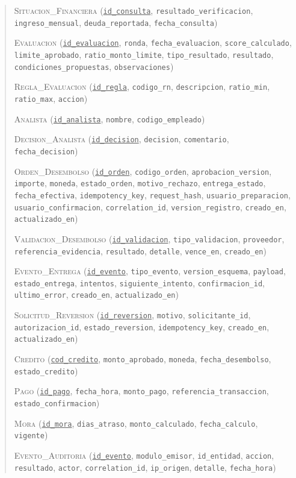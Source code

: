 \begin{quote}
\textsc{Situacion\_Financiera} (\underline{\texttt{id\_consulta}}, \texttt{resultado\_verificacion}, \texttt{ingreso\_mensual}, \texttt{deuda\_reportada}, \texttt{fecha\_consulta})

\textsc{Evaluacion} (\underline{\texttt{id\_evaluacion}}, \texttt{ronda}, \texttt{fecha\_evaluacion}, \texttt{score\_calculado}, \texttt{limite\_aprobado}, \texttt{ratio\_monto\_limite}, \texttt{tipo\_resultado}, \texttt{resultado}, \texttt{condiciones\_propuestas}, \texttt{observaciones})

\textsc{Regla\_Evaluacion} (\underline{\texttt{id\_regla}}, \texttt{codigo\_rn}, \texttt{descripcion}, \texttt{ratio\_min}, \texttt{ratio\_max}, \texttt{accion})

\textsc{Analista} (\underline{\texttt{id\_analista}}, \texttt{nombre}, \texttt{codigo\_empleado})

\textsc{Decision\_Analista} (\underline{\texttt{id\_decision}}, \texttt{decision}, \texttt{comentario}, \texttt{fecha\_decision})

\textsc{Orden\_Desembolso} (\underline{\texttt{id\_orden}}, \texttt{codigo\_orden}, \texttt{aprobacion\_version}, \texttt{importe}, \texttt{moneda}, \texttt{estado\_orden}, \texttt{motivo\_rechazo}, \texttt{entrega\_estado}, \texttt{fecha\_efectiva}, \texttt{idempotency\_key}, \texttt{request\_hash}, \texttt{usuario\_preparacion}, \texttt{usuario\_confirmacion}, \texttt{correlation\_id}, \texttt{version\_registro}, \texttt{creado\_en}, \texttt{actualizado\_en})

\textsc{Validacion\_Desembolso} (\underline{\texttt{id\_validacion}}, \texttt{tipo\_validacion}, \texttt{proveedor}, \texttt{referencia\_evidencia}, \texttt{resultado}, \texttt{detalle}, \texttt{vence\_en}, \texttt{creado\_en})

\textsc{Evento\_Entrega} (\underline{\texttt{id\_evento}}, \texttt{tipo\_evento}, \texttt{version\_esquema}, \texttt{payload}, \texttt{estado\_entrega}, \texttt{intentos}, \texttt{siguiente\_intento}, \texttt{confirmacion\_id}, \texttt{ultimo\_error}, \texttt{creado\_en}, \texttt{actualizado\_en})

\textsc{Solicitud\_Reversion} (\underline{\texttt{id\_reversion}}, \texttt{motivo}, \texttt{solicitante\_id}, \texttt{autorizacion\_id}, \texttt{estado\_reversion}, \texttt{idempotency\_key}, \texttt{creado\_en}, \texttt{actualizado\_en})

\textsc{Credito} (\underline{\texttt{cod\_credito}}, \texttt{monto\_aprobado}, \texttt{moneda}, \texttt{fecha\_desembolso}, \texttt{estado\_credito})

\textsc{Pago} (\underline{\texttt{id\_pago}}, \texttt{fecha\_hora}, \texttt{monto\_pago}, \texttt{referencia\_transaccion}, \texttt{estado\_confirmacion})

\textsc{Mora} (\underline{\texttt{id\_mora}}, \texttt{dias\_atraso}, \texttt{monto\_calculado}, \texttt{fecha\_calculo}, \texttt{vigente})

\textsc{Evento\_Auditoria} (\underline{\texttt{id\_evento}}, \texttt{modulo\_emisor}, \texttt{id\_entidad}, \texttt{accion}, \texttt{resultado}, \texttt{actor}, \texttt{correlation\_id}, \texttt{ip\_origen}, \texttt{detalle}, \texttt{fecha\_hora})
\end{quote}
